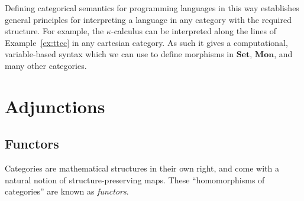 \documentclass[11pt,oneside]{book}
\newtheorem{example}[theorem]{Example}
\theoremstyle{definition}
\newcommand{\kw}[1]{\ensuremath{ \mathsf{#1} }}
\begin{document}

Defining categorical semantics for programming languages in this way
establishes general principles
for interpreting a language in any category
with the required structure.
For example,
the $\kappa$-calculus
\citep{kappa}
can be interpreted
along the lines of Example~\ref{ex:ttcc}
in any cartesian category.
As such it gives a computational,
variable-based syntax
which we can use to define morphisms
in $\mathbf{Set}$, $\mathbf{Mon}$,
and many other categories.



\section{Adjunctions} %

\subsection{Functors} %

Categories are mathematical structures in their own right,
and come with a natural notion of
structure-preserving maps.
These ``homomorphisms of categories'' are known as \emph{functors}.
\end{document}
